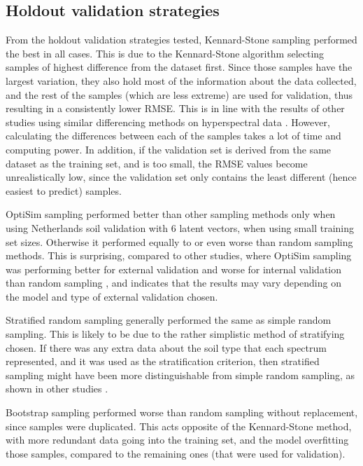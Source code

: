 \documentclass{isprs}
\begin{document}
\subsection{Holdout validation strategies}\label{sec:Holdout validation strategies 3}

From the holdout validation strategies tested, Kennard-Stone sampling performed the best in all cases. This is due to the Kennard-Stone algorithm selecting samples of highest difference from the dataset first. Since those samples have the largest variation, they also hold most of the information about the data collected, and the rest of the samples (which are less extreme) are used for validation, thus resulting in a consistently lower RMSE. This is in line with the results of other studies using similar differencing methods on hyperspectral data \cite{golbraikh2000predictive}. However, calculating the differences between each of the samples takes a lot of time and computing power. In addition, if the validation set is derived from the same dataset as the training set, and is too small, the RMSE values become unrealistically low, since the validation set only contains the least different (hence easiest to predict) samples.

OptiSim sampling performed better than other sampling methods only when using Netherlands soil validation with 6 latent vectors, when using small training set sizes. Otherwise it performed equally to or even worse than random sampling methods. This is surprising, compared to other studies, where OptiSim sampling was performing better for external validation and worse for internal validation than random sampling \cite{clark2003boosted}, and indicates that the results may vary depending on the model and type of external validation chosen.

Stratified random sampling generally performed the same as simple random sampling. This is likely to be due to the rather simplistic method of stratifying chosen. If there was any extra data about the soil type that each spectrum represented, and it was used as the stratification criterion, then stratified sampling might have been more distinguishable from simple random sampling, as shown in other studies \cite{kohavi1995study}.

Bootstrap sampling performed worse than random sampling without replacement, since samples were duplicated. This acts opposite of the Kennard-Stone method, with more redundant data going into the training set, and the model overfitting those samples, compared to the remaining ones (that were used for validation).
\end{document}

